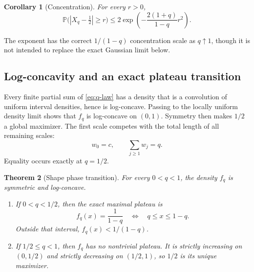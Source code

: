 \documentclass[11pt,oneside]{article}
\newtheorem{theorem}{Theorem}[section]
\newtheorem{corollary}[theorem]{Corollary}
\theoremstyle{definition}
\theoremstyle{remark}
\newcommand{\Prob}{\mathbb P}
\begin{document}
\begin{corollary}[Concentration]
\label{cor:concentration}
For every $r>0$,
\begin{equation}
 \Prob\bigl(|X_q-\tfrac12|\ge r\bigr)
 \le2\exp\!\left(-\frac{2(1+q)}{1-q}r^2\right).             \label{eq:hoeffding}
\end{equation}
\end{corollary}

The exponent has the correct $1/(1-q)$ concentration scale as $q\uparrow1$, though it is not
intended to replace the exact Gaussian limit below.

\subsection{Log-concavity and an exact plateau transition}

Every finite partial sum of \eqref{eq:q-law} has a density that is a convolution of uniform
interval densities, hence is log-concave.  Passing to the locally uniform density limit shows
that $f_q$ is log-concave on $(0,1)$.  Symmetry then makes $1/2$ a global maximizer.
The first scale competes with the total length of all remaining scales:
\[
 w_0=c,
 \qquad
 \sum_{j\ge1}w_j=q.
\]
Equality occurs exactly at $q=1/2$.

\begin{theorem}[Shape phase transition]
\label{thm:plateau}
For every $0<q<1$, the density $f_q$ is symmetric and log-concave.

\begin{enumerate}[label=\textup{(\roman*)}]
\item If $0<q<1/2$, then the exact maximal plateau is
\begin{equation}
 f_q(x)=\frac{1}{1-q}
 \quad\Longleftrightarrow\quad q\le x\le1-q.                 \label{eq:plateau}
\end{equation}
Outside that interval, $f_q(x)<1/(1-q)$.
\item If $1/2\le q<1$, then $f_q$ has no nontrivial plateau.  It is strictly increasing on
$(0,1/2)$ and strictly decreasing on $(1/2,1)$, so $1/2$ is its unique maximizer.
\end{enumerate}
\end{theorem}
\end{document}
